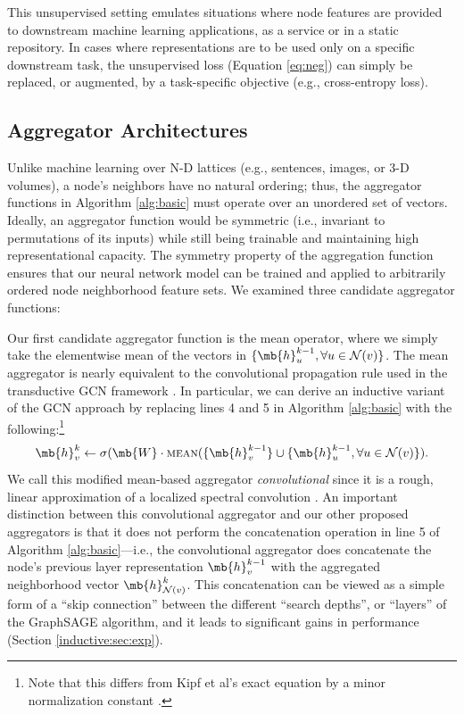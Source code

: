 This unsupervised setting emulates situations where node features are provided to downstream machine learning applications, as a service or in a static repository. 
In cases where representations are to be used only on a specific downstream task, the unsupervised loss (Equation \ref{eq:neg}) can simply be replaced, or augmented, by a task-specific objective (e.g., cross-entropy loss).

\subsection{Aggregator Architectures}\label{inductive:sec:aggs}

Unlike machine learning over N-D lattices (e.g., sentences, images, or 3-D volumes), a node's neighbors have no natural ordering; thus, the aggregator functions in Algorithm \ref{alg:basic} must operate over an unordered set of vectors.
Ideally, an aggregator function would be symmetric (i.e., invariant to permutations of its inputs) while still being trainable and maintaining high representational capacity. 
The symmetry property of the aggregation function ensures that our neural network model can be trained and applied to arbitrarily ordered node neighborhood feature sets.
We examined three candidate aggregator functions:

 Our first candidate aggregator function is the mean operator, where we simply take the elementwise mean of the vectors in $\{\mb{h}_u^{k-1}, \forall u \in \mathcal{N}(v)\}$.
The mean aggregator is nearly equivalent to the convolutional propagation rule used in the transductive GCN framework \cite{kipf2016semi}.
In particular, we can derive an inductive variant of the GCN approach by replacing lines 4 and 5 in Algorithm \ref{alg:basic} with the following:\footnote{Note that this differs from Kipf et al's exact equation by a minor normalization constant \cite{kipf2016semi}.}
\begin{equation}
\mb{h}^k_v \leftarrow \sigma(\mb{W}\cdot\textsc{mean}(\{\mb{h}^{k-1}_v\} \cup \{\mb{h}_u^{k-1}, \forall u \in {\mathcal{N}(v)}\}).
\end{equation}
We call this modified mean-based aggregator {\em convolutional} since it is a rough, linear approximation of a localized spectral convolution \cite{kipf2016semi}.
An important distinction between this convolutional aggregator and our other proposed aggregators is that it does not perform the concatenation operation in line 5 of Algorithm \ref{alg:basic}---i.e., the convolutional aggregator does concatenate the node's previous layer representation $\mb{h}^{k-1}_v$ with the aggregated neighborhood vector $\mb{h}^{k}_{\mathcal{N}(v)}$. 
This concatenation can be viewed as a simple form of a ``skip connection'' \cite{he2016identity} between the different ``search depths'', or ``layers'' of the GraphSAGE algorithm, and it leads to significant gains in performance (Section \ref{inductive:sec:exp}).  

